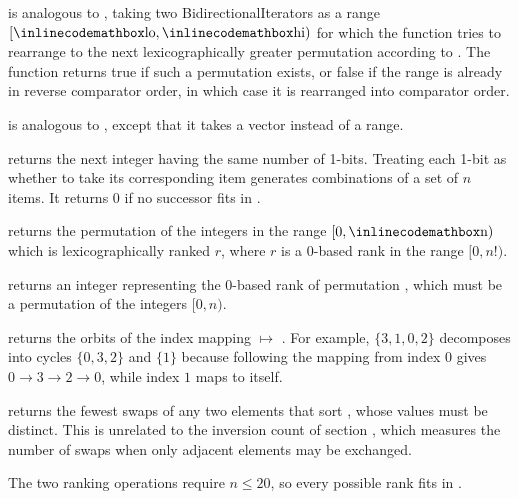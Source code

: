 \begin{compactitem}
  \item {} is analogous to , taking two BidirectionalIterators as a range $[{\inlinecodemath{lo}}, {\inlinecodemath{hi}})$ for which the function tries to rearrange to the next lexicographically greater permutation according to . The function returns true if such a permutation exists, or false if the range is already in reverse comparator order, in which case it is rearranged into comparator order.
  \item {} is analogous to , except that it takes a vector instead of a range.
  \item {} returns the next integer having the same number of 1-bits. Treating each 1-bit as whether to take its corresponding item generates combinations of a set of $n$ items. It returns $0$ if no successor fits in .
  \item {} returns the permutation of the integers in the range $[0, {\inlinecodemath{n}})$ which is lexicographically ranked $r$, where $r$ is a 0-based rank in the range $[0, n!)$.
  \item {} returns an integer representing the 0-based rank of permutation , which must be a permutation of the integers $[0, n)$.
  \item {} returns the orbits of the index mapping  $\mapsto$ . For example, $\{3, 1, 0, 2\}$ decomposes into cycles $\{0, 3, 2\}$ and $\{1\}$ because following the mapping from index $0$ gives $0 \to 3 \to 2 \to 0$, while index $1$ maps to itself.
  \item {} returns the fewest swaps of any two elements that sort , whose values must be distinct. This is unrelated to the inversion count of section , which measures the number of swaps when only adjacent elements may be exchanged.
\end{compactitem}

The two ranking operations require $n \leq 20$, so every possible rank fits in .

